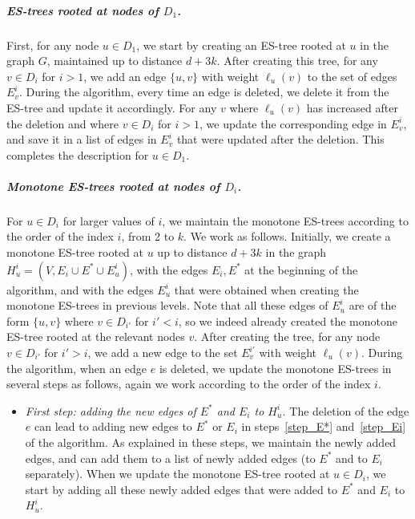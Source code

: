 \documentclass[11pt]{article}
\theoremstyle{definition}
\theoremstyle{remark}
\newcommand{\ytodo}[1]{\todo[color=blue!20]{Y: #1}}
\begin{document}
\begin{titlepage}
\subparagraph{ES-trees rooted at nodes of $D_1$.} 
First, for any node $u \in D_1$, we start by creating an ES-tree rooted at $u$ in the graph $G$, maintained up to distance $d+3k$. After creating this tree, for any $v \in D_i$ for $i > 1$, we add an edge $\{u,v\}$ with weight $\ell_u(v)$ to the set of edges $E_v^i$. During the algorithm, every time an edge is deleted, we delete it from the ES-tree and update it accordingly. For any $v$ where $\ell_u(v)$ has increased after the deletion and where $v \in D_i$ for $i > 1$, we update the corresponding edge in $E_v^i$, and save it in a list of edges in $E_v^i$ that were updated after the deletion. This completes the description for $u \in D_1$. 
\subparagraph{Monotone ES-trees rooted at nodes of $D_i$.}
For $u \in D_i$ for larger values of $i$, we maintain the monotone ES-trees according to the order of the index $i$, from 2 to $k$. We work as follows. Initially, we create a monotone ES-tree rooted at $u$ up to distance $d+3k$ in the graph $H_u^i=(V,E_i \cup E^* \cup E_u^i)$, with the edges $E_i,E^*$ at the beginning of the algorithm, and with the edges $E_u^i$ that were obtained when creating the monotone ES-trees in previous levels. Note that all these edges of $E_u^i$ are of the form $\{u,v\}$ where $v \in D_{i'}$ for $i' < i$, so we indeed already created the monotone ES-tree rooted at the relevant nodes $v$.  After creating the tree, for any node $v \in D_{i'}$ for $i' > i$, we add a new edge to the set $E_v^{i'}$ with weight $\ell_u(v)$.
During the algorithm, when an edge $e$ is deleted, we update the monotone ES-trees in several steps as follows, again we work according to the order of the index $i$.
\begin{itemize}
    \item \textit{First step: adding the new edges of $E^*$ and $E_i$ to $H_u^i$.} The deletion of the edge $e$ can lead to adding new edges to $E^*$ or $E_i$ in steps~\ref{step_E*} and~\ref{step_Ei} of the algorithm. As explained in these steps, we maintain the newly added edges, and can add them to a list of newly added edges (to $E^*$ and to $E_i$ separately). When we update the monotone ES-tree rooted at $u \in D_i$, we start by adding all these newly added edges that were added to $E^*$ and $E_i$ to $H_u^i$.

\end{itemize}
\end{titlepage}
\end{document}
